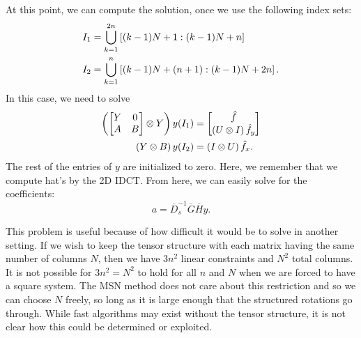At this point, we can compute the solution, once we use the following
index sets:
%
\begin{align}
    I_{1} &= \bigcup_{k=1}^{2n} \left[ (k-1)N + 1: (k-1)N + n \right] \nonumber\\
    I_{2} &= \bigcup_{k=1}^{n} \left[ (k-1)N + (n+1): (k-1)N + 2n \right].
\end{align}
%
In this case, we need to solve
%
\begin{align}
    \left( \begin{bmatrix} Y & 0 \\ A & B \end{bmatrix} \otimes Y \right)y(I_{1})
        &= \begin{bmatrix} \hat{f} \\ \left( U\otimes I \right)\hat{f}_{y}
        \end{bmatrix} \nonumber\\
    \left( Y\otimes B \right)y(I_{2}) &= \left( I\otimes U \right)\hat{f}_{x}.
\end{align}
%
The rest of the entries of $y$ are initialized to zero.
Here, we remember that we compute hat's by the 2D IDCT.
From here, we can easily solve for the coefficients:
%
\begin{equation}
    a = \overline{D}_{s}^{-1} \overline{G} \overline{H}y.
\end{equation}

This problem is useful because of how difficult it would
be to solve in another setting.
If we wish to keep the tensor structure with each matrix
having the same number of columns $N$, then we have $3n^{2}$ linear
constraints and $N^{2}$ total columns.
It is not possible for $3n^{2} = N^{2}$ to hold for all $n$ and $N$
when we are forced to have a square system.
The MSN method does not care about this restriction and so we can
choose $N$ freely, so long as it is large enough that the structured
rotations go through.
While fast algorithms may exist without the tensor structure,
it is not clear how this could be determined or exploited.


